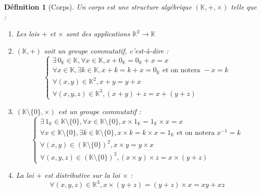 \documentclass[a4paper,12pt,french]{report}
\newtheorem{definition}{Définition}[section]
\begin{document}
			\begin{definition}[Corps] 
				Un corps est une structure algébrique \( (\mathbb{K} , + , \times ) \) telle que :
				\begin{enumerate}
					\item Les lois \( + \) et \( \times \) sont des applications \( \mathbb{K}^2 \longrightarrow \mathbb{K} \)
					\item \((\mathbb{K} , +)\) soit un groupe commutatif, c'est-à-dire :
						\[ 
							\left\{ 
							\begin{array}{lll}
								\exists \, 0_{\mathbb{K}} \in \mathbb{K} , \forall x \in \mathbb{K}, x + 0_{\mathbb{K}} = 0_{\mathbb{K}} + x = x
								\\
								\forall x \in \mathbb{K} , \exists k \in \mathbb{K} , x + k = k + x = 0_{\mathbb{K}} \mbox{  et on notera } -x = k
								\\
								\forall (x,y) \in \mathbb{K}^{2},
											x + y = y + x
										
								\\
								\forall (x, y, z) \in \mathbb{K}^3, (x + y) + z = x + (y + z)
									 
							\end{array}
							\right.
						\]
					\item \((\mathbb{K}\setminus\{0\}, \times) \) est un groupe commutatif :
						\[ 
								\left\{ 
								\begin{array}{lll}
									\exists \, 1_{\mathbb{K}} \in \mathbb{K}\setminus\{0\} , \forall x \in \mathbb{K}\setminus\{0\}, x \times 1_{\mathbb{K}} = 1_{\mathbb{K}} \times x = x
									\\
									\forall x \in \mathbb{K}\setminus\{0\} , \exists k \in \mathbb{K}\setminus\{0\} , x \times k = k \times x = 1_{\mathbb{K}} \mbox{  et on notera } x^{-1} = k
									\\
									\forall (x,y) \in (\mathbb{K}\setminus\{0\})^{2},
												x \times y = y \times x
									\\
									\forall (x, y, z) \in (\mathbb{K}\setminus\{0\})^3, (x \times y) \times z = x \times (y + z)
										 
								\end{array}
								\right.
							\]
					\item La loi \( + \) est distributive sur la loi \( \times \) :
						\[
						\forall (x, y, z) \in \mathbb{K}^3, x \times (y + z) = (y + z) \times x = xy + xz
						\]
				\end{enumerate}
			
			\end{definition}
			
\end{document}
